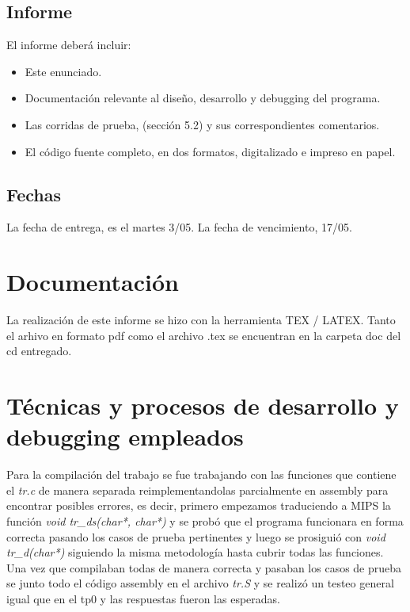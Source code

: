\documentclass[a4paper,10pt]{article}
\begin{document}
\subsection{Informe}
El informe deber\'{a} incluir:

\begin{itemize}
\item Este enunciado.
\item Documentaci\'{o}n relevante al dise\~no, desarrollo y debugging del programa.
\item Las corridas de prueba, (secci\'{o}n 5.2) y sus correspondientes comentarios.
\item El c\'{o}digo fuente completo, en dos formatos, digitalizado e impreso en papel.
\end{itemize}

\subsection{Fechas}
La fecha de entrega, es el martes 3/05. La fecha de vencimiento, 17/05.

\section{Documentaci\'{o}n}
La realizaci\'{o}n  de este informe se hizo con la herramienta TEX / LATEX. Tanto el arhivo en formato pdf como el archivo .tex se encuentran en la carpeta doc del cd entregado.

\section{T\'{e}cnicas y procesos de desarrollo y debugging empleados}

Para la compilaci\'{o}n del trabajo se fue trabajando con las funciones que contiene el \textit{tr.c} de manera separada reimplementandolas parcialmente en 
assembly para encontrar posibles errores, es decir, primero empezamos traduciendo a MIPS la funci\'{o}n \textit{void tr\_ds(char*, char*)} y se prob\'{o} que el programa 
funcionara en forma correcta pasando los casos de prueba pertinentes y luego se prosigui\'{o} con \textit{void tr\_d(char*)} siguiendo la misma 
metodolog\'{i}a hasta cubrir todas las funciones. 
Una vez que compilaban todas de manera correcta y pasaban los casos de prueba se junto todo el c\'{o}digo assembly en el archivo \textit{tr.S} y se realiz\'{o} un 
testeo general igual que en el tp0 y las respuestas fueron las esperadas.
\end{document}
